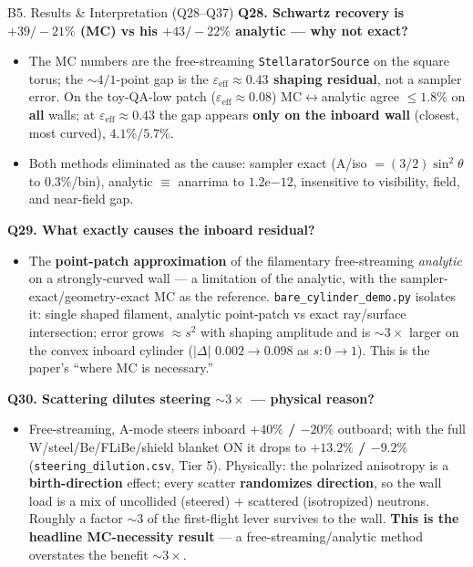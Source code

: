 \documentclass[11pt,aspectratio=169]{beamer}
\newcommand{\qitem}[1]{\medskip\textbf{#1}\par}
\begin{document}
\begin{frame}[allowframebreaks]{B5. Results \& Interpretation (Q28--Q37)}
\small
\qitem{Q28. Schwartz recovery is $+39/-21\%$ (MC) vs his $+43/-22\%$ analytic --- why not exact?}
\begin{itemize}
\item The MC numbers are the free-streaming \texttt{StellaratorSource} on the square torus; the
      $\sim 4/1$-point gap is the \textbf{$\varepsilon_{\mathrm{eff}} \approx 0.43$ shaping
      residual}, not a sampler error. On the toy-QA-low patch
      ($\varepsilon_{\mathrm{eff}} \approx 0.08$) MC$\leftrightarrow$analytic agree $\le 1.8\%$
      on \textbf{all} walls; at $\varepsilon_{\mathrm{eff}} \approx 0.43$ the gap appears
      \textbf{only on the inboard wall} (closest, most curved), $4.1\%/5.7\%$.
\item Both methods eliminated as the cause: sampler exact (A/iso $= (3/2)\sin^2\theta$ to
      $0.3\%$/bin), analytic $\equiv$ anarrima to $1.2\mathrm{e}{-12}$, insensitive to
      visibility, field, and near-field gap.
\end{itemize}

\qitem{Q29. What exactly causes the inboard residual?}
\begin{itemize}
\item The \textbf{point-patch approximation} of the filamentary free-streaming \emph{analytic}
      on a strongly-curved wall --- a limitation of the analytic, with the
      sampler-exact/geometry-exact MC as the reference. \texttt{bare\_cylinder\_demo.py}
      isolates it: single shaped filament, analytic point-patch vs exact ray/surface
      intersection; error grows $\approx s^2$ with shaping amplitude and is $\sim 3\times$
      larger on the convex inboard cylinder ($|\Delta|$ $0.002 \to 0.098$ as $s: 0 \to 1$).
      This is the paper's ``where MC is necessary.''
\end{itemize}

\framebreak
\qitem{Q30. Scattering dilutes steering $\sim 3\times$ --- physical reason?}
\begin{itemize}
\item Free-streaming, A-mode steers inboard \textbf{$+40\%$ / $-20\%$} outboard; with the full
      W/steel/Be/FLiBe/shield blanket ON it drops to \textbf{$+13.2\%$ / $-9.2\%$}
      (\texttt{steering\_dilution.csv}, Tier 5). Physically: the polarized anisotropy is a
      \textbf{birth-direction} effect; every scatter \textbf{randomizes direction}, so the wall
      load is a mix of uncollided (steered) $+$ scattered (isotropized) neutrons. Roughly a
      factor $\sim 3$ of the first-flight lever survives to the wall. \textbf{This is the
      headline MC-necessity result} --- a free-streaming/analytic method overstates the benefit
      $\sim 3\times$.
\end{itemize}


\end{frame}
\end{document}
